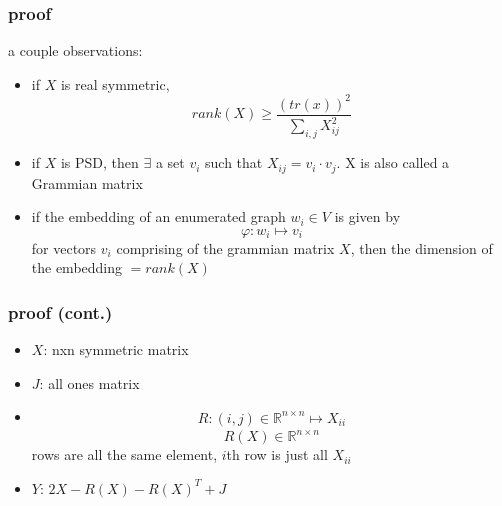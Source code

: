 \documentclass{beamer}
\begin{document}
\begin{frame}
    \frametitle{proof}
    a couple observations:

    \begin{itemize}
        
        \item if \(X\) is real symmetric,\begin{equation}\label{rank_inequality}
            rank(X)\geq \frac{(tr(x))^2}{\sum_{i,j}^{}X_{ij}^2}
        \end{equation}
    
        \item if \(X\) is PSD, then \(\exists \) a set \(v_i\) such that \(X_{ij}=v_i\cdot v_j\). X is also called a Grammian matrix
        \item if the embedding of an enumerated graph \(w_i\in V\) is given by \begin{equation}
            \varphi:w_i\mapsto v_i
        \end{equation}
        for vectors \(v_i\) comprising of the grammian matrix \(X\), then the dimension of the embedding \(= rank(X)\)
        
    \end{itemize}
    



\end{frame}

\begin{frame}
    \frametitle{proof (cont.)}

    \begin{itemize}
        \item \(X\): nxn symmetric matrix
        \item \(J\): all ones matrix
        \item \begin{equation}
            \begin{split}
                R: (i,j)\in\mathbb R^{n\times n}\mapsto X_{ii}
            \end{split}
        \end{equation}
        \begin{equation*}
            R(X)\in \mathbb R^{n\times n}
        \end{equation*}
        rows are all the same element, \(i\)th row is just all \(X_{ii}\)
        \item \(Y\): \(2X - R(X) - R(X)^T+J\)
    \end{itemize}

\end{frame}
\end{document}
